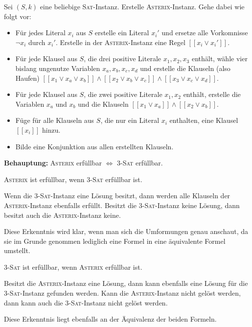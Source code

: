 \documentclass{article}
\begin{document}
Sei $(S, k)$ eine beliebige \textsc{Sat}-Instanz. 
Erstelle \textsc{Asterix}-Instanz. Gehe dabei wie folgt vor:
\begin{itemize}
  \item Für jedes Literal $x_i$ aus $S$ erstelle ein Literal $x_i'$ und ersetze alle Vorkomnisse $\neg x_i$ durch $x_i'$. Erstelle in der \textsc{Asterix}-Instanz eine Regel $[[x_i \vee x_i']]$.
	\item Für jede Klausel aus $S$, die drei positive Literale $x_1, x_2, x_3$ enthält, wähle vier bislang ungenutze Variablen $x_a, x_b, x_c, x_d$ und erstelle die Klauseln (also Haufen) $[[x_1 \vee x_a \vee x_b]] \wedge [[x_2 \vee x_b \vee x_c]] \wedge [[x_3 \vee x_c \vee x_d]]$.
	\item Für jede Klausel aus $S$, die zwei positive Literale $x_1, x_2$ enthält, erstelle die Variablen $x_a$ und $x_b$ und die Klauseln $[[x_1 \vee x_a]] \wedge [[x_2 \vee x_b]]$.
	\item Füge für alle Klauseln aus $S$, die nur ein Literal $x_i$ enthalten, eine Klausel $[[x_i]]$ hinzu.
	\item Bilde eine Konjunktion aus allen erstellten Klauseln.
\end{itemize}

\smallskip

\textbf{Behauptung:} \textsc{Asterix} erfüllbar $\Leftrightarrow$ \textsc{3-Sat} erfüllbar.

\smallskip

\textsc{Asterix} ist erfüllbar, wenn \textsc{3-Sat} erfüllbar ist.

Wenn die \textsc{3-Sat}-Instanz eine Lösung besitzt, dann werden alle Klauseln der \textsc{Asterix}-Instanz ebenfalls erfüllt.
Besitzt die \textsc{3-Sat}-Instanz keine Lösung, dann besitzt auch die \textsc{Asterix}-Instanz keine.

Diese Erkenntnis wird klar, wenn man sich die Umformungen genau anschaut, da sie im Grunde genommen lediglich eine Formel in eine äquivalente Formel umstellt.

\smallskip

\textsc{3-Sat} ist erfüllbar, wenn \textsc{Asterix} erfüllbar ist.

Besitzt die \textsc{Asterix}-Instanz eine Lösung, dann kann ebenfalls eine Lösung für die \textsc{3-Sat}-Instanz gefunden werden.
Kann die \textsc{Asterix}-Instanz nicht gelöst werden, dann kann auch die \textsc{3-Sat}-Instanz nicht gelöst werden.

Diese Erkenntnis liegt ebenfalls an der Äquivalenz der beiden Formeln.
\end{document}
